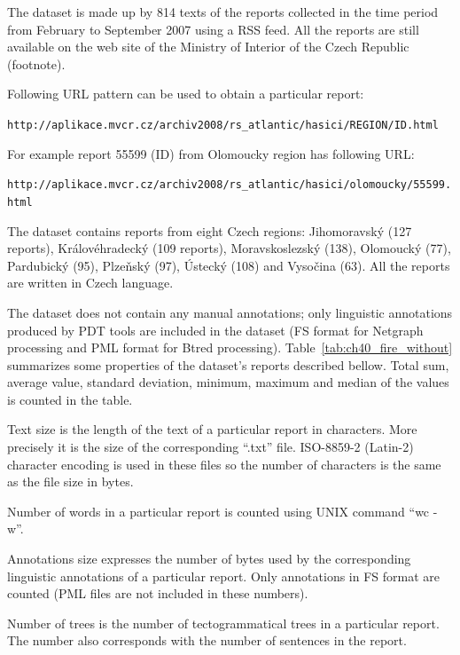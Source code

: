 The dataset is made up by 814 texts of the reports collected in the time period from February to September 2007 using a RSS feed. All the reports are still available on the web site of the Ministry of Interior of the Czech Republic (footnote). 

Following URL pattern can be used to obtain a particular report:


\begin{center}
\verb+http://aplikace.mvcr.cz/archiv2008/rs_atlantic/hasici/REGION/ID.html+
\end{center}

For example report 55599 (ID) from Olomoucky region has following URL:

\begin{center}
\verb+http://aplikace.mvcr.cz/archiv2008/rs_atlantic/hasici/olomoucky/55599.html+
\end{center}


The dataset contains reports from eight Czech regions: Jihomoravský (127 reports), Královéhradecký (109 reports), Moravskoslezský (138), Olomoucký (77), Pardubický (95), Plzeňský (97), Ústecký (108) and Vysočina (63). All the reports are written in Czech language. 

The dataset does not contain any manual annotations; only linguistic annotations produced by PDT tools are included in the dataset (FS format for Netgraph processing and PML format for Btred processing). Table~\ref{tab:ch40_fire_without} summarizes some properties of the dataset’s reports described bellow.  Total sum, average value, standard deviation, minimum, maximum and median of the values is counted in the table.


Text size is the length of the text of a particular report in characters. More precisely it is the size of the corresponding ``.txt'' file. ISO-8859-2 (Latin-2) character encoding is used in these files so the number of characters is the same as the file size in bytes. 

Number of words in a particular report is counted using UNIX command ``wc -w''.

Annotations size expresses the number of bytes used by the corresponding linguistic annotations of a particular report. Only annotations in FS format are counted (PML files are not included in these numbers).

Number of trees is the number of tectogrammatical trees in a particular report. The number also corresponds with the number of sentences in the report.


